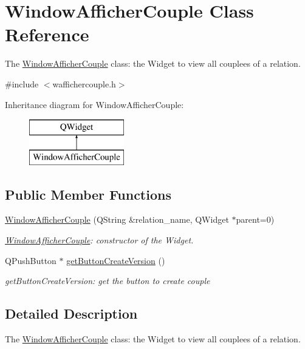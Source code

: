 \hypertarget{class_window_afficher_couple}{}\section{Window\+Afficher\+Couple Class Reference}
\label{class_window_afficher_couple}


The \hyperlink{class_window_afficher_couple}{Window\+Afficher\+Couple} class\+: the Widget to view all couplees of a relation.  




{\ttfamily \#include $<$waffichercouple.\+h$>$}

Inheritance diagram for Window\+Afficher\+Couple\+:\begin{figure}[H]
\begin{center}
\leavevmode
\includegraphics[height=2.000000cm]{class_window_afficher_couple}
\end{center}
\end{figure}
\subsection*{Public Member Functions}
\begin{DoxyCompactItemize}
\item 
\hyperlink{class_window_afficher_couple_a6f57f30e30be963212ea7a355f460c30}{Window\+Afficher\+Couple} (Q\+String \&relation\+\_\+name, Q\+Widget $\ast$parent=0)
\begin{DoxyCompactList}\small\item\em \hyperlink{class_window_afficher_couple}{Window\+Afficher\+Couple}\+: constructor of the Widget. \end{DoxyCompactList}\item 
Q\+Push\+Button $\ast$ \hyperlink{class_window_afficher_couple_af6825c2bdd3c0612409d517f229a5e60}{get\+Button\+Create\+Version} ()
\begin{DoxyCompactList}\small\item\em get\+Button\+Create\+Version\+: get the button to create couple \end{DoxyCompactList}\end{DoxyCompactItemize}


\subsection{Detailed Description}
The \hyperlink{class_window_afficher_couple}{Window\+Afficher\+Couple} class\+: the Widget to view all couplees of a relation. 


